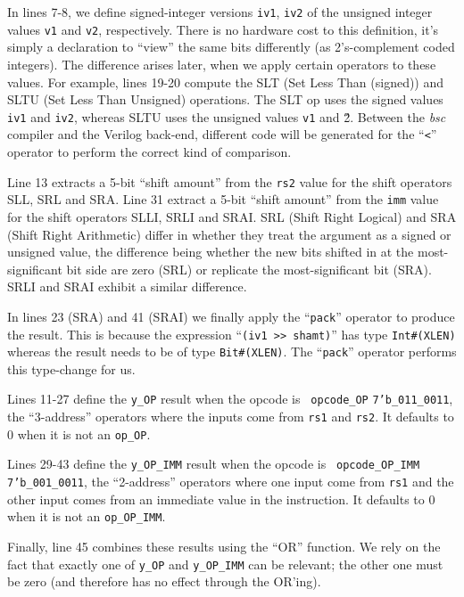 In lines 7-8, we define signed-integer versions {\tt iv1}, {\tt iv2}
of the unsigned integer values {\tt v1} and {\tt v2}, respectively.
There is no hardware cost to this definition, it's simply a
declaration to ``view'' the same bits differently (as 2's-complement
coded integers).  The difference arises later, when we apply certain
operators to these values.  For example, lines 19-20 compute the SLT
(Set Less Than (signed)) and SLTU (Set Less Than Unsigned) operations.
The SLT op uses the signed values {\tt iv1} and {\tt iv2}, whereas
SLTU uses the unsigned values {\tt v1} and {\v2}.  Between the
\emph{bsc} compiler and the Verilog back-end, different code will be
generated for the ``{\tt <}'' operator to perform the correct kind of
comparison.

Line 13 extracts a 5-bit ``shift amount'' from the {\tt rs2} value for
the shift operators SLL, SRL and SRA.  Line 31 extract a 5-bit ``shift
amount'' from the {\tt imm} value for the shift operators SLLI, SRLI
and SRAI.  SRL (Shift Right Logical) and SRA (Shift Right Arithmetic)
differ in whether they treat the argument as a signed or unsigned
value, the difference being whether the new bits shifted in at the
most-significant bit side are zero (SRL) or replicate the
most-significant bit (SRA).  SRLI and SRAI exhibit a similar
difference.

In lines 23 (SRA) and 41 (SRAI) we finally apply the ``{\tt pack}''
operator to produce the result. This is because the expression
``\verb|(iv1 >> shamt)|'' has type {\tt Int\#(XLEN)} whereas the
result needs to be of type {\tt Bit\#(XLEN)}.  The ``{\tt pack}''
operator performs this type-change for us.

Lines 11-27 define the {\tt y\_OP} result when the opcode is {\tt
opcode\_OP} {\ie} {\tt 7'b\_011\_0011}, {\ie} the ``3-address''
operators where the inputs come from {\tt rs1} and {\tt rs2}.
It defaults to 0 when it is not an {\tt op\_OP}.

Lines 29-43 define the {\tt y\_OP\_IMM} result when the opcode is {\tt
opcode\_OP\_IMM} {\ie} {\tt 7'b\_001\_0011}, {\ie} the ``2-address''
operators where one input come from {\tt rs1} and the other input
comes from an immediate value in the instruction.
It defaults to 0 when it is not an {\tt op\_OP\_IMM}.

Finally, line 45 combines these results using the ``OR'' function.  We
rely on the fact that exactly one of \verb|y_OP| and \verb|y_OP_IMM|
can be relevant; the other one must be zero (and therefore has no
effect through the OR'ing).

